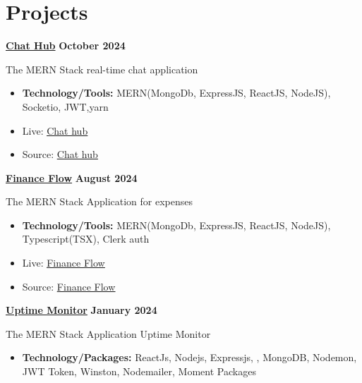 \documentclass[letterpaper, 8pt]{article}
\newcommand{\bulletSpace}{\vspace{-8pt}}
\newcommand{\secStartSpace}{\vspace{3pt}}
\newcommand{\spaceCollapse}{\vspace{-5pt}}
\begin{document}



\section{\color{blue} \textbf{Projects}}
\secStartSpace

\begin{addmargin}[1em]{1em}
\noindent\href{https://github.com/sukhlotey/Chat-Hub}{\textbf{Chat Hub}}  \hfill \textbf{October 2024} 
		
	\noindent The MERN Stack real-time chat application
	\spaceCollapse
	\begin{itemize}
		\item \textbf{Technology/Tools:} MERN(MongoDb, ExpressJS, ReactJS, NodeJS), Socketio, JWT,yarn
		      \bulletSpace
            	\item Live:  \href{https://freechathub.netlify.app/}
  {\underline{Chat hub}}
		\item Source: \href{https://github.com/sukhlotey/Finance-Flow}
  {\underline{Chat hub}}
	\end{itemize}
\noindent\href{https://github.com/sukhlotey/Finance-Flow}{\textbf{Finance Flow}}  \hfill \textbf{August 2024} 
		
	\noindent The MERN Stack Application for expenses
	\spaceCollapse
	\begin{itemize}
		\item \textbf{Technology/Tools:} MERN(MongoDb, ExpressJS, ReactJS, NodeJS), Typescript(TSX), Clerk auth
		      \bulletSpace
            	\item Live:  \href{https://personal-financeflow.netlify.app/auth}
  {\underline{Finance Flow}}
		\item Source: \href{https://github.com/sukhlotey/Finance-Flow}
  {\underline{Finance Flow}}
	\end{itemize}
		
 \noindent\href{https://github.com/sukhlotey/Uptime-monitor}{\textbf{Uptime Monitor}}  \hfill \textbf{January 2024} 
		
	\noindent The MERN Stack Application Uptime Monitor
	\spaceCollapse
	\begin{itemize}
		\item \textbf{Technology/Packages:} ReactJs, Nodejs, Expressjs, , MongoDB, Nodemon, JWT Token, Winston, Nodemailer, Moment Packages


\end{itemize}
\end{addmargin}
\end{document}
